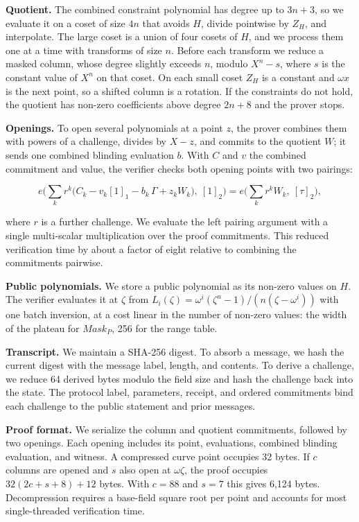 \textbf{Quotient.} The combined constraint polynomial has degree up to \(3n + 3\), so we evaluate it on a coset of size \(4n\) that avoids \(H\), divide pointwise by \(Z_H\), and interpolate. The large coset is a union of four cosets of \(H\), and we process them one at a time with transforms of size \(n\). Before each transform we reduce a masked column, whose degree slightly exceeds \(n\), modulo \(X^n - s\), where \(s\) is the constant value of \(X^n\) on that coset. On each small coset \(Z_H\) is a constant and \(\omega x\) is the next point, so a shifted column is a rotation. If the constraints do not hold, the quotient has non-zero coefficients above degree \(2n + 8\) and the prover stops.

\textbf{Openings.} To open several polynomials at a point \(z\), the prover combines them with powers of a challenge, divides by \(X - z\), and commits to the quotient \(W\); it sends one combined blinding evaluation \(b\). With \(C\) and \(v\) the combined commitment and value, the verifier checks both opening points with two pairings:

\[e\Big(\sum_{k} r^k \big(C_k - v_k [1]_1 - b_k\, \Gamma + z_k W_k\big),\ [1]_2\Big) = e\Big(\sum_{k} r^k W_k,\ [\tau]_2\Big),\]

where \(r\) is a further challenge. We evaluate the left pairing argument with a single multi-scalar multiplication over the proof commitments. This reduced verification time by about a factor of eight relative to combining the commitments pairwise.

\textbf{Public polynomials.} We store a public polynomial as its non-zero values on \(H\). The verifier evaluates it at \(\zeta\) from \(L_i(\zeta) = \omega^i(\zeta^n - 1)/(n(\zeta - \omega^i))\) with one batch inversion, at a cost linear in the number of non-zero values: the width of the plateau for \(Mask_P\), 256 for the range table.

\textbf{Transcript.} We maintain a SHA-256 digest. To absorb a message, we hash the current digest with the message label, length, and contents. To derive a challenge, we reduce 64 derived bytes modulo the field size and hash the challenge back into the state. The protocol label, parameters, receipt, and ordered commitments bind each challenge to the public statement and prior messages.

\textbf{Proof format.} We serialize the column and quotient commitments, followed by two openings. Each opening includes its point, evaluations, combined blinding evaluation, and witness. A compressed curve point occupies 32 bytes. If \(c\) columns are opened and \(s\) also open at \(\omega\zeta\), the proof occupies \(32(2c+s+8)+12\) bytes. With \(c=88\) and \(s=7\) this gives 6,124 bytes. Decompression requires a base-field square root per point and accounts for most single-threaded verification time.

